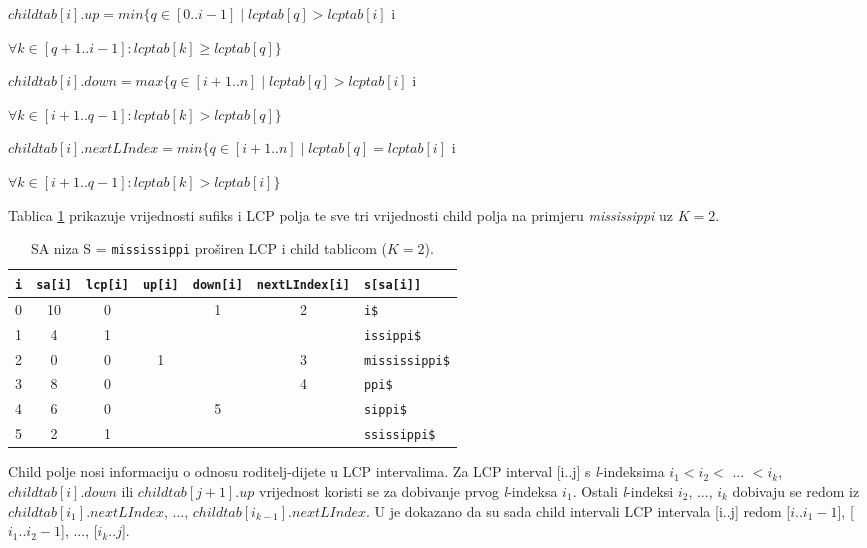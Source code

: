 \documentclass[times, utf8, seminar, numeric]{fer}
\begin{document}
$childtab[i].up = min\{q \in [0..i-1] \mid lcptab[q] > lcptab[i]$ i \\ \strut\hfill 
$\forall k \in [q+1..i-1] : lcptab[k] \geq lcptab[q]\}$

$childtab[i].down = max\{q \in [i+1..n] \mid lcptab[q] > lcptab[i]$ i \\ \strut\hfill
$\forall k \in [i+1..q-1] : lcptab[k] > lcptab[q]\}$

$childtab[i].nextLIndex = min\{q \in [i+1..n] \mid lcptab[q] = lcptab[i]$ i \\ \strut\hfill
$\forall k \in [i+1..q-1] : lcptab[k] > lcptab[i]\}$

Tablica \ref{tbl:example} prikazuje vrijednosti sufiks i LCP polja te sve tri vrijednosti child polja na primjeru \textit{mississippi} uz $K = 2$.

\begin{table}[h]
	\centering
  \caption{SA  niza S = \texttt{mississippi} proširen LCP i child tablicom ($K = 2$).}
	\label{tbl:example}
	
	\begin{tabular}{ccccccl}
		\hline
    \texttt{i} & \texttt{sa[i]} & \texttt{lcp[i]} & \texttt{up[i]} & \texttt{down[i]} & \texttt{nextLIndex[i]} & \texttt{s[sa[i]]} \\ \hline
    0 & 10 &  0 &    &  1 &  2 & \texttt{i\$}           \\
    1 &  4 &  1 &    &    &    & \texttt{issippi\$}     \\
    2 &  0 &  0 &  1 &    &  3 & \texttt{mississippi\$} \\
    3 &  8 &  0 &    &    &  4 & \texttt{ppi\$}         \\
    4 &  6 &  0 &    &  5 &    & \texttt{sippi\$}       \\
    5 &  2 &  1 &    &    &    & \texttt{ssissippi\$}   \\ \hline
	\end{tabular}
\end{table}


Child polje nosi informaciju o odnosu roditelj-dijete u LCP intervalima. Za LCP interval [i..j] s \textit{l}-indeksima $i_1 < i _2 <$ ... $< i_k$, $childtab[i].down$ ili $childtab[j+1].up$ vrijednost koristi se za dobivanje prvog \textit{l}-indeksa $i_1$. Ostali \textit{l}-indeksi $i _2$, ..., $i_k$ dobivaju se redom iz $childtab[i_1].nextLIndex$, ..., $childtab[i_{k-1}].nextLIndex$. U \cite{esa} je dokazano da su sada child intervali LCP intervala [i..j] redom [$i..i_1-1$], [$i_1..i_2-1$], ..., [$i_k..j$].
\end{document}
